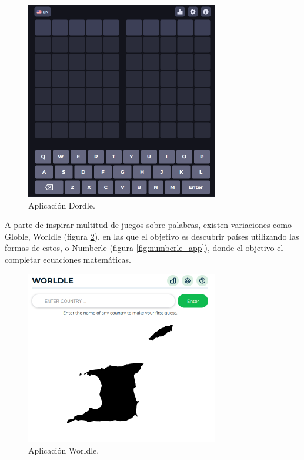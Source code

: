 \begin{figure}
	\centering
	\includegraphics[clip=true,width=0.75\textwidth]{images/dordle.png}
	\caption{Aplicación Dordle.}
	\label{fig:dordle_app}
\end{figure}


A parte de inspirar multitud de juegos sobre palabras, existen variaciones como Globle, Worldle (figura \ref{fig:worldle_app}), en las que el objetivo es descubrir países utilizando las formas de estos, o Numberle (figura \ref{fig:numberle_app}), donde el objetivo el completar ecuaciones matemáticas.

\begin{figure}
	\centering
	\includegraphics[clip=true,width=0.75\textwidth]{images/worldle.png}
	\caption{Aplicación Worldle.}
	\label{fig:worldle_app}
\end{figure}

